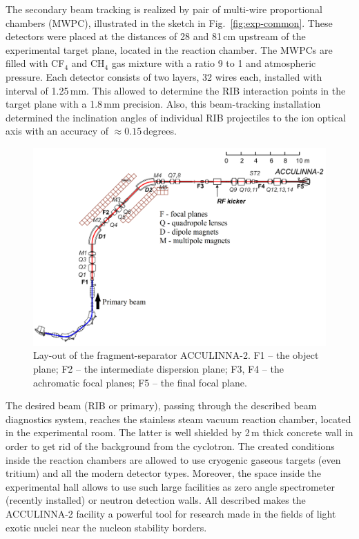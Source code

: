 The secondary beam tracking is realized by pair of multi-wire proportional chambers (MWPC), illustrated in the sketch in Fig.\ \ref{fig:exp-common}.
These detectors were placed at the distances of 28 and 81\,cm upstream of the experimental target plane, located in the reaction chamber.
The MWPCs are filled with CF$_{4}$ and CH$_{4}$ gas mixture with a ratio 9 to 1 and atmospheric pressure.
Each detector consists of two layers, 32 wires each, installed with interval of 1.25\,mm. 
This allowed to determine the RIB interaction points in the target plane with a 1.8\,mm  precision.
Also, this beam-tracking installation determined the inclination angles of individual RIB projectiles to the ion optical axis with an accuracy of $\approx 0.15 $\,degrees.


\begin{figure}[t]
	\begin{center}
		\includegraphics[width=1\textwidth]{figures/acculinna2.png}
	\end{center}
	\caption{Lay-out of the fragment-separator ACCULINNA-2. F1 – the object plane; F2 – the intermediate dispersion plane; F3, F4 – the achromatic focal planes; F5 – the final focal plane.}
	\label{fig:acculinna2_scheme}
\end{figure}

The desired beam (RIB or primary), passing through the described beam diagnostics system, reaches the stainless steam vacuum reaction chamber, located in the experimental room.
The latter is well shielded by 2\,m thick concrete wall in order to get rid of the background from the cyclotron.
The created conditions inside the reaction chambers are allowed to use cryogenic gaseous targets (even tritium) and all the modern detector types.
Moreover, the space inside the experimental hall allows to use such large facilities as zero angle spectrometer (recently installed) or neutron detection walls.
All described makes the ACCULINNA-2 facility a powerful tool for research made in the fields of light exotic nuclei near the nucleon stability borders.

